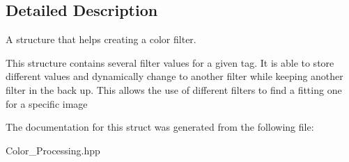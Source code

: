 \subsection{Detailed Description}
A structure that helps creating a color filter. 

This structure contains several filter values for a given tag. It is able to store different values and dynamically change to another filter while keeping another filter in the back up. This allows the use of different filters to find a fitting one for a specific image 

The documentation for this struct was generated from the following file\+:\begin{DoxyCompactItemize}
\item 
Color\+\_\+\+Processing.\+hpp\end{DoxyCompactItemize}
